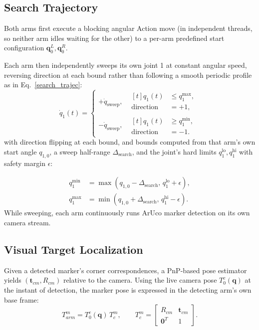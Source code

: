 \documentclass[letterpaper, 10 pt, conference]{ieeeconf}  %
\begin{document}
\subsection{Search Trajectory}
\label{search_trajectory}
Both arms first execute a blocking angular Action move (in independent threads, so neither arm idles waiting for the other) to a per-arm predefined start configuration $\mathbf q_0^{L}, \mathbf q_0^{R}$.

Each arm then independently sweeps its own joint 1 at constant angular speed, reversing direction at each bound rather than following a smooth periodic profile as in Eq.~\ref{search_trajec}:
\begin{equation}
\dot{q}_{1}(t)=
\begin{cases}
+\dot{q}_{\mathrm{sweep}}, &
\begin{aligned}[t]
q_{1}(t) &\leq q_{1}^{\max},\\
\mathrm{direction} &= +1,
\end{aligned}
\\[1ex]
-\dot{q}_{\mathrm{sweep}}, &
\begin{aligned}[t]
q_{1}(t) &\geq q_{1}^{\min},\\
\mathrm{direction} &= -1.
\end{aligned}
\end{cases}
\label{search_trajec}
\end{equation}
with direction flipping at each bound, and bounds computed from that arm's own start angle $q_{1,0}$, a sweep half-range $\Delta_{\text{search}}$, and the joint's hard limits $q_1^{\text{lo}}, q_1^{\text{hi}}$ with safety margin $\epsilon$:

\begin{equation}
\begin{aligned}
q_{1}^{\min} &= \max\!\left(q_{1,0}-\Delta_{\mathrm{search}},
\, q_{1}^{\mathrm{lo}}+\epsilon\right), \\
q_{1}^{\max} &= \min\!\left(q_{1,0}+\Delta_{\mathrm{search}},
\, q_{1}^{\mathrm{hi}}-\epsilon\right).
\end{aligned}
\end{equation}
While sweeping, each arm continuously runs ArUco marker detection on its own camera
stream.
\subsection{Visual Target Localization}
Given a detected marker's corner correspondences, a PnP-based pose estimator yields $(\mathbf t_{cm}, R_{cm})$ relative to the camera. Using the live camera pose $T_0^{c}(\mathbf q)$ at the instant of detection, the marker pose is expressed in the detecting arm's own base frame:
\begin{equation}
T^{m}_{arm}
=
T^{c}_{0}(\mathbf{q})\,
T^{m}_c,
\qquad
T^{m}_c
=
\begin{bmatrix}
R_{cm} & \mathbf{t}_{cm} \\
\mathbf{0}^{T} & 1
\end{bmatrix}.
\end{equation}
\end{document}
